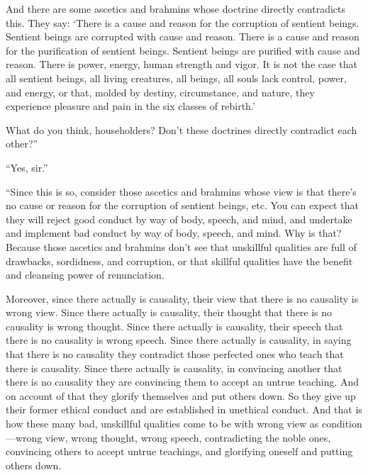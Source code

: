 \documentclass[12pt,openany]{book}%
\begin{document}
And there are some ascetics and brahmins whose doctrine directly contradicts this. They say: ‘There is a cause and reason for the corruption of sentient beings. Sentient beings are corrupted with cause and reason. There is a cause and reason for the purification of sentient beings. Sentient beings are purified with cause and reason. There is power, energy, human strength and vigor. It is not the case that all sentient beings, all living creatures, all beings, all souls lack control, power, and energy, or that, molded by destiny, circumstance, and nature, they experience pleasure and pain in the six classes of rebirth.’ 

What do you think, householders? Don’t these doctrines directly contradict each other?” 

“Yes, sir.” 

“Since this is so, consider those ascetics and brahmins whose view is that there’s no cause or reason for the corruption of sentient beings, etc. You can expect that they will reject good conduct by way of body, speech, and mind, and undertake and implement bad conduct by way of body, speech, and mind. Why is that? Because those ascetics and brahmins don’t see that unskillful qualities are full of drawbacks, sordidness, and corruption, or that skillful qualities have the benefit and cleansing power of renunciation. 

Moreover, since there actually is causality, their view that there is no causality is wrong view. Since there actually is causality, their thought that there is no causality is wrong thought. Since there actually is causality, their speech that there is no causality is wrong speech. Since there actually is causality, in saying that there is no causality they contradict those perfected ones who teach that there is causality. Since there actually is causality, in convincing another that there is no causality they are convincing them to accept an untrue teaching. And on account of that they glorify themselves and put others down. So they give up their former ethical conduct and are established in unethical conduct. And that is how these many bad, unskillful qualities come to be with wrong view as condition—wrong view, wrong thought, wrong speech, contradicting the noble ones, convincing others to accept untrue teachings, and glorifying oneself and putting others down. 
\end{document}
